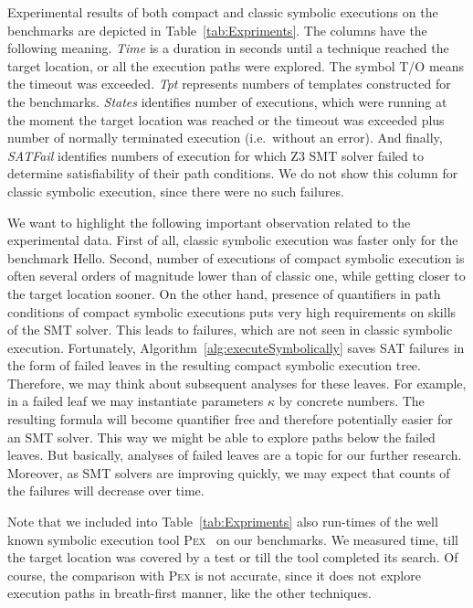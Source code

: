 \documentclass{sig-alternate}%
\newcommand{\Pex}{\textsc{Pex}\xspace}
\begin{document}
Experimental results of both compact and classic symbolic executions
on the benchmarks are depicted in Table~\ref{tab:Expriments}. The
columns have the following meaning.  \textit{Time} is a duration in
seconds until a technique reached the target location, or all the
execution paths were explored. The symbol T/O means the timeout was
exceeded. \textit{Tpt} represents numbers of templates constructed for
the benchmarks. \textit{States} identifies number of executions, which
were running at the moment the target location was reached or the
timeout was exceeded plus number of normally terminated execution
(i.e.~without an error). And finally, \textit{SATFail} identifies
numbers of execution for which Z3 SMT solver failed to determine
satisfiability of their path conditions. We do not show this column for
classic symbolic execution, since there were no such failures.

We want to highlight the following important observation related to
the experimental data. First of all, classic symbolic execution was
faster only for the benchmark Hello. Second, number of executions of
compact symbolic execution is often several orders of magnitude lower
than of classic one, while getting closer to the target location
sooner. On the other hand, presence of quantifiers in path conditions
of compact symbolic executions puts very high requirements on skills of
the SMT solver. This leads to failures, which are not seen in classic
symbolic execution.
%
Fortunately, Algorithm~\ref{alg:executeSymbolically} saves SAT
failures in the form of failed leaves in the resulting compact
symbolic execution tree. Therefore, we may think about subsequent
analyses for these leaves. For example, in a failed leaf we may
instantiate parameters $\kappa$ by concrete numbers. The resulting
formula will become quantifier free and therefore potentially easier
for an SMT solver. This way we might be able to explore paths below
the failed leaves. But basically, analyses of failed leaves are a
topic for our further research. Moreover, as SMT solvers are improving
quickly, we may expect that counts of the failures will decrease over
time.


Note that we included into Table~\ref{tab:Expriments} also run-times
of the well known symbolic execution tool \textsc{Pex}~\cite{TdH08} on
our benchmarks. We measured time, till the target location was covered
by a test or till the tool completed its search. Of course, the
comparison with \Pex is not accurate, since it does not explore
execution paths in breath-first manner, like the other techniques.
\end{document}
